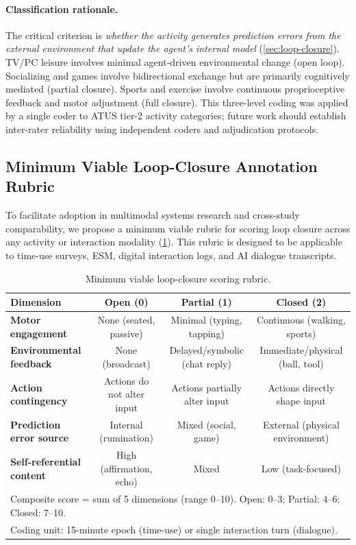 \documentclass[a4paper,11pt,titlepage]{article}
\begin{document}
\paragraph{Classification rationale.} The critical criterion is \textit{whether the activity generates prediction errors from the external environment that update the agent's internal model} (\cref{sec:loop-closure}). TV/PC leisure involves minimal agent-driven environmental change (open loop). Socializing and games involve bidirectional exchange but are primarily cognitively mediated (partial closure). Sports and exercise involve continuous proprioceptive feedback and motor adjustment (full closure). This three-level coding was applied by a single coder to ATUS tier-2 activity categories; future work should establish inter-rater reliability using independent coders and adjudication protocols.


\subsection{Minimum Viable Loop-Closure Annotation Rubric}\label{app:rubric}

To facilitate adoption in multimodal systems research and cross-study comparability, we propose a minimum viable rubric for scoring loop closure across any activity or interaction modality (\cref{tab:lc-rubric}). This rubric is designed to be applicable to time-use surveys, ESM, digital interaction logs, and AI dialogue transcripts.

\begin{table}[htbp]
\centering
\caption{Minimum viable loop-closure scoring rubric.}
\label{tab:lc-rubric}
\small
\begin{tabular}{p{3.5cm}ccc}
\toprule
Dimension & \textbf{Open (0)} & \textbf{Partial (1)} & \textbf{Closed (2)} \\
\midrule
\textbf{Motor engagement} & None (seated, passive) & Minimal (typing, tapping) & Continuous (walking, sports) \\
\textbf{Environmental feedback} & None (broadcast) & Delayed/symbolic (chat reply) & Immediate/physical (ball, tool) \\
\textbf{Action contingency} & Actions do not alter input & Actions partially alter input & Actions directly shape input \\
\textbf{Prediction error source} & Internal (rumination) & Mixed (social, game) & External (physical environment) \\
\textbf{Self-referential content} & High (affirmation, echo) & Mixed & Low (task-focused) \\
\bottomrule
\multicolumn{4}{l}{\scriptsize Composite score = sum of 5 dimensions (range 0--10). Open: 0--3; Partial: 4--6; Closed: 7--10.} \\
\multicolumn{4}{l}{\scriptsize Coding unit: 15-minute epoch (time-use) or single interaction turn (dialogue).}
\end{tabular}
\end{table}
\end{document}
